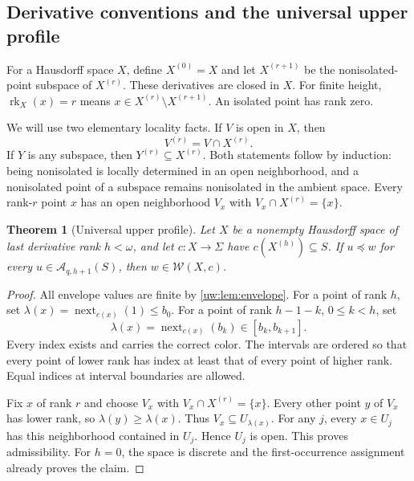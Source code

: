\documentclass[11pt,letterpaper]{article}
\numberwithin{equation}{section}
\newtheorem{theorem}{Theorem}[section]
\theoremstyle{definition}
\theoremstyle{remark}
\theoremstyle{definition}
\newcommand{\rk}{\operatorname{rk}}
\newcommand{\W}{\mathcal W}
\newcommand{\A}{\mathcal A}
\newcommand{\subseq}{\preccurlyeq}
\newcommand{\nextpos}{\operatorname{next}}
\begin{document}
\subsection{Derivative conventions and the universal upper profile}
For a Hausdorff space $X$, define $X^{(0)}=X$ and let $X^{(r+1)}$ be the
nonisolated-point subspace of $X^{(r)}$. These derivatives are closed in $X$.
For finite height, $\rk_X(x)=r$ means
$x\in X^{(r)}\setminus X^{(r+1)}$. An isolated point has rank zero.

We will use two elementary locality facts. If $V$ is open in $X$, then
\begin{equation}\label{uw:eq:locality}
 V^{(r)}=V\cap X^{(r)}.
\end{equation}
If $Y$ is any subspace, then $Y^{(r)}\subseteq X^{(r)}$. Both statements
follow by induction: being nonisolated is locally determined in an open
neighborhood, and a nonisolated point of a subspace remains nonisolated in
the ambient space. Every rank-$r$ point $x$ has an open neighborhood $V_x$
with $V_x\cap X^{(r)}=\{x\}$.

\begin{theorem}[Universal upper profile]\label{uw:thm:upper-profile}
Let $X$ be a nonempty Hausdorff space of last derivative rank $h<\omega$,
and let $c:X\to\Sigma$ have $c(X^{(h)})\subseteq S$. If
$u\subseq w$ for every $u\in\A_{q,h+1}(S)$, then $w\in\W(X,c)$.
\end{theorem}
\begin{proof}
All envelope values are finite by \cref{uw:lem:envelope}. For a point of rank
$h$, set $\lambda(x)=\nextpos_{c(x)}(1)\le b_0$. For a point of rank
$h-1-k$, $0\le k<h$, set
\begin{equation}\label{uw:eq:rank-map}
 \lambda(x)=\nextpos_{c(x)}(b_k)\in[b_k,b_{k+1}].
\end{equation}
Every index exists and carries the correct color. The intervals are ordered
so that every point of lower rank has index at least that of every point of
higher rank. Equal indices at interval boundaries are allowed.

Fix $x$ of rank $r$ and choose $V_x$ with
$V_x\cap X^{(r)}=\{x\}$. Every other point $y$ of $V_x$ has lower rank,
so $\lambda(y)\ge\lambda(x)$. Thus $V_x\subseteq U_{\lambda(x)}$.
For any $j$, every $x\in U_j$ has this neighborhood contained in $U_j$.
Hence $U_j$ is open. This proves admissibility. For $h=0$, the space is
discrete and the first-occurrence assignment already proves the claim.
\end{proof}
\end{document}
